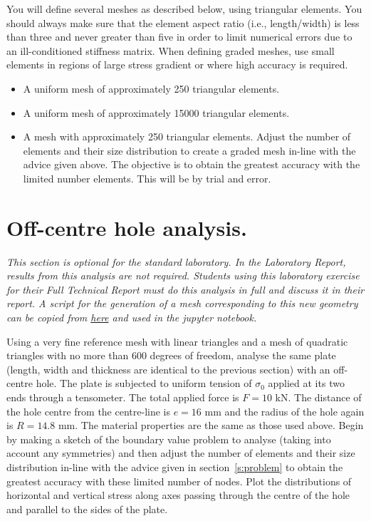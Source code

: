 \documentclass[11pt,a4paper]{article}
\begin{document}
You will define several meshes as described below, using triangular elements. You should always make sure that the element aspect ratio (i.e., length/width) is less than three and never greater than five in order to limit numerical errors due to an ill-conditioned stiffness matrix. When defining graded meshes, use small elements in regions of large stress gradient or where high accuracy is required.
%
\begin{itemize}
\item A uniform mesh of approximately 250 triangular elements. %
\item A uniform mesh of approximately 15000 triangular elements.
\item A mesh with approximately 250 triangular elements. 
Adjust the number of elements and their size distribution to create a graded mesh in-line with the advice given above. The objective is to obtain the greatest accuracy with the limited number elements. This will be by trial and error.
\end{itemize}
%


%
\section{Off-centre hole analysis.}
%

\textit{This section is optional for the standard laboratory. In the Laboratory Report, results
from this analysis are not required. Students using this laboratory exercise for their Full
Technical Report must do this analysis in full and discuss it in their report. A script for the generation of a mesh corresponding to this new geometry can be copied from \href{https://colab.research.google.com/github/fcirak/3D7Lab/blob/main/notebook/3D7-mesh-FTR-v0.ipynb}{here} and used in the jupyter notebook.}

Using a very fine reference mesh with linear triangles and a mesh of quadratic triangles
with no more than 600 degrees of freedom, analyse the same plate (length, width and thickness are identical to the previous section) with
an off-centre hole. The plate is subjected to uniform tension of $\sigma_0$ applied at its two ends through a tensometer. The total applied force is $F=10$ kN. The distance
of the hole centre from the centre-line is $e = 16$ mm and the radius of the hole again
is $R = 14.8$ mm. The material properties are the same as those used above. Begin
by making a sketch of the boundary value problem to analyse (taking into account any
symmetries) and then adjust the number of elements and their size distribution in-line
with the advice given in section~\ref{s:problem} to obtain the greatest accuracy with these limited
number of nodes. Plot the distributions of horizontal and vertical stress along axes passing through the
centre of the hole and parallel to the sides of the plate.
\end{document}
